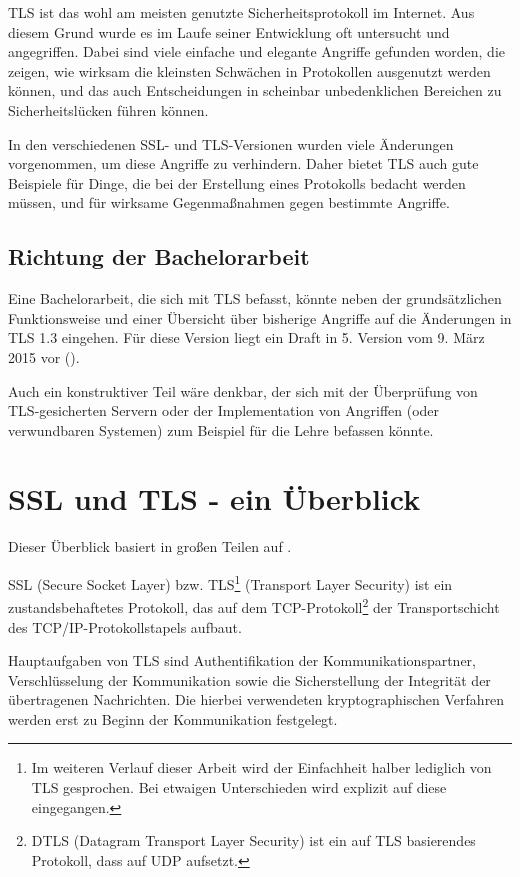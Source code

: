 \documentclass[
    12pt,
    headings=small,
    parskip=half,           %
    bibliography=totoc,
    numbers=noenddot,       %
    open=any,               %
   final                   %
    ]{scrreprt}
\begin{document}
TLS ist das wohl am meisten genutzte Sicherheitsprotokoll im Internet. Aus diesem Grund wurde es im Laufe seiner Entwicklung oft untersucht und angegriffen. Dabei sind viele einfache und elegante Angriffe gefunden worden, die zeigen, wie wirksam die kleinsten Schwächen in Protokollen ausgenutzt werden können, und das auch Entscheidungen in scheinbar unbedenklichen Bereichen zu Sicherheitslücken führen können. 

In den verschiedenen SSL- und TLS-Versionen wurden viele Änderungen vorgenommen, um diese Angriffe zu verhindern. Daher bietet TLS auch gute Beispiele für Dinge, die bei der Erstellung eines Protokolls bedacht werden müssen, und für wirksame Gegenmaßnahmen gegen bestimmte Angriffe.

\section{Richtung der Bachelorarbeit}

Eine Bachelorarbeit, die sich mit TLS befasst, könnte neben der grundsätzlichen Funktionsweise und einer Übersicht über bisherige Angriffe auf die Änderungen in TLS 1.3 eingehen. Für diese Version liegt ein Draft in 5. Version vom 9. März 2015 vor (\cite{tls13}). 

Auch ein konstruktiver Teil wäre denkbar, der sich mit der Überprüfung von TLS-gesicherten Servern oder der Implementation von Angriffen (oder verwundbaren Systemen) zum Beispiel für die Lehre befassen könnte. 

\chapter{SSL und TLS - ein Überblick}

Dieser Überblick basiert in großen Teilen auf \cite{schmeh09}.

SSL (Secure Socket Layer) bzw. TLS\footnote{Im weiteren Verlauf dieser Arbeit wird der Einfachheit halber lediglich von TLS gesprochen. Bei etwaigen Unterschieden wird explizit auf diese eingegangen.} (Transport Layer Security) ist ein zustandsbehaftetes Protokoll, das auf dem TCP-Protokoll\footnote{DTLS (Datagram Transport Layer Security) ist ein auf TLS basierendes Protokoll, dass auf UDP aufsetzt.} der Transportschicht des TCP/IP-Protokollstapels aufbaut. 

Hauptaufgaben von TLS sind Authentifikation der Kommunikationspartner, Verschlüsselung der Kommunikation sowie die Sicherstellung der Integrität der übertragenen Nachrichten. Die hierbei verwendeten kryptographischen Verfahren werden erst zu Beginn der Kommunikation festgelegt. 
\end{document}
